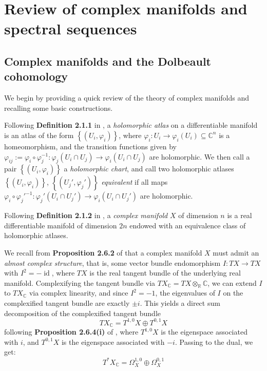 \documentclass[11pt]{article}
\newcommand{\C}{\mathbb{C}}
\newcommand{\R}{\mathbb{R}}
\newcommand{\id}{\operatorname{id}}
\theoremstyle{definition}
\numberwithin{theorem}{section} %
\numberwithin{equation}{section} %
\begin{document}
\section{Review of complex manifolds and spectral sequences}


\subsection{Complex manifolds and the Dolbeault cohomology}
We begin by providing a quick review of the theory of complex manifolds and recalling some basic constructions.
\begin{definition}
    Following \textbf{Definition 2.1.1} in \cite{Huybrechts2005}, a \emph{holomorphic atlas} on a differentiable manifold is an atlas of the form $\left\{\left(U_i, \varphi_i\right)\right\}$, where $\varphi_i:U_i\to \varphi_i\left(U_i\right)\subseteq \C^n$ is a homeomorphism, and the transition functions given by $\varphi_{ij}:=\varphi_i\circ \varphi_j^{-1} : \varphi_j\left(U_i\cap U_j\right)\to \varphi_i\left(U_i\cap U_j\right)$ are holomorphic. We then call a pair $\left\{\left(U_i, \varphi_i\right)\right\}$ a \emph{holomorphic chart}, and call two holomorphic atlases $\left\{\left(U_i, \varphi_i\right)\right\}$, $\left\{\left(U_j', \varphi_j'\right)\right\}$ \emph{equivalent} if all maps $\varphi_i\circ \varphi_j'^{-1}: \varphi_j'\left(U_i\cap U_j'\right)\to \varphi_i\left(U_i\cap U_j'\right)$ are holomorphic. 
\end{definition}

\begin{definition}
Following \textbf{Definition 2.1.2} in \cite{Huybrechts2005}, a \emph{complex manifold} $X$ of dimension $n$ is a real differentiable manifold of dimension $2n$ endowed with an equivalence class of holomorphic atlases.
\end{definition}

\noindent We recall from \textbf{Proposition 2.6.2} of \cite{Huybrechts2005} that a complex manifold $X$ must admit an \emph{almost complex structure}, that is, some vector bundle endomorphism $I:TX\to TX$ with $I^2 = -\id$, where $TX$ is the real tangent bundle of the underlying real manifold. Complexifying the tangent bundle via $TX_\C = TX \otimes_\R \C$, we can extend $I$ to $TX_\C$ via complex linearity, and since $I^2=-1$, the eigenvalues of $I$ on the complexified tangent bundle are exactly $\pm i$. This yields a direct sum decomposition of the complexified tangent bundle
$$
TX_\C = T^{1,0}X \oplus T^{0,1}X
$$
following \textbf{Proposition 2.6.4(i)} of \cite{Huybrechts2005}, where $T^{1,0}X$ is the eigenspace associated with $i$, and $T^{0,1}X$ is the eigenspace associated with $-i$. Passing to the dual, we get:
$$
T^*X_\C =\Omega^{1,0}_X \oplus \Omega^{0,1}_X
$$
\end{document}
